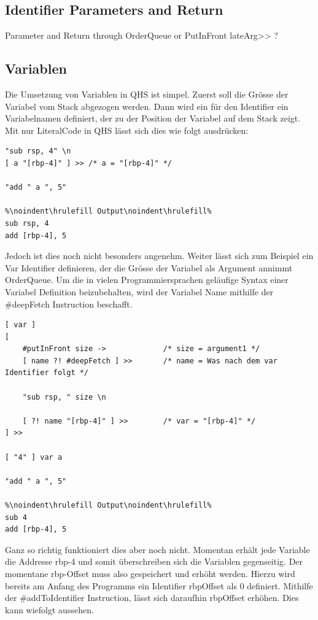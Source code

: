 \subsection{Identifier Parameters and Return}
Parameter and Return through OrderQueue or PutInFront
lateArg>> ?

\subsection{Variablen} \label{sec:qhs-vars}
Die Umsetzung von Variablen in QHS ist simpel. Zuerst soll die Grösse der Variabel vom Stack abgezogen werden. Dann wird ein für den Identifier ein Variabelnamen definiert, der zu der Position der Variabel auf dem Stack zeigt.
Mit nur LiteralCode in QHS lässt sich dies wie folgt ausdrücken:

\begin{lstlisting}[language=QHS, caption=Beispiel einer Variabel in QHS]
"sub rsp, 4" \n
[ a "[rbp-4]" ] >> /* a = "[rbp-4]" */

"add " a ", 5"

%\noindent\hrulefill Output\noindent\hrulefill%
sub rsp, 4
add [rbp-4], 5
\end{lstlisting}

Jedoch ist dies noch nicht besonders angenehm. Weiter lässt sich zum Beispiel ein Var Identifier definieren, der die Grösse der Variabel als Argument annimmt OrderQueue. Um die in vielen Programmiersprachen geläufige Syntax
einer Variabel Definition beizubehalten, wird der Variabel Name mithilfe der \#deepFetch Instruction beschafft.

\begin{lstlisting}[language=QHS, caption=Definition einer Variable mit var Identifier]
[ var ]
[
    #putInFront size ->             /* size = argument1 */
    [ name ?! #deepFetch ] >>       /* name = Was nach dem var Identifier folgt */

    "sub rsp, " size \n

    [ ?! name "[rbp-4]" ] >>        /* var = "[rbp-4]" */
] >> 

[ "4" ] var a 

"add " a ", 5"
    
%\noindent\hrulefill Output\noindent\hrulefill%
sub 4
add [rbp-4], 5
\end{lstlisting}

Ganz so richtig funktioniert dies aber noch nicht. Momentan erhält jede Variable die Addresse rbp-4 und somit überschreiben sich die Variablen gegenseitig. Der momentane rbp-Offset muss also gespeichert und erhöht werden.
Hierzu wird bereits am Anfang des Programms ein Identifier rbpOffset als 0 definiert. Mithilfe der \#addToIdentifier Instruction, lässt sich daraufhin rbpOffset erhöhen. Dies kann wiefolgt aussehen.

